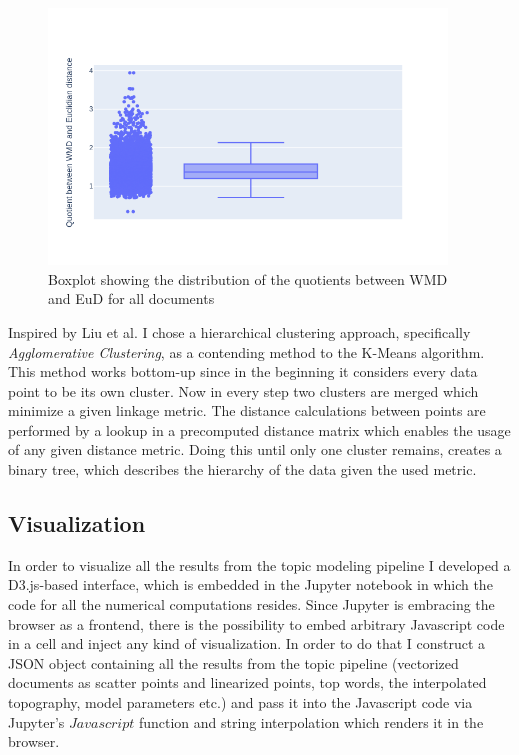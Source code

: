 \begin{figure}[htbp!]
	\centering
	\includegraphics[width=400px]{../chapters/implementation/pics/wmd-eud}
	\caption{\label{pic:wmd_eud_boxplot} Boxplot showing the distribution of the quotients between WMD and EuD for all documents}
\end{figure}

Inspired by Liu et al. \cite{Liu:2018:INE:3219819.3220001} I chose a hierarchical clustering approach, specifically \textit{Agglomerative Clustering}, as a contending method to the K-Means algorithm. This method works bottom-up since in the beginning it considers every data point to be its own cluster. Now in every step two clusters are merged which minimize a given linkage metric. The distance calculations between points are performed by a lookup in a precomputed distance matrix which enables the usage of any given distance metric. Doing this until only one cluster remains, creates a binary tree, which describes the hierarchy of the data given the used metric. 

\subsection{Visualization}

In order to visualize all the results from the topic modeling pipeline I developed a D3.js-based interface, which is embedded in the Jupyter notebook in which the code for all the numerical computations resides. Since Jupyter is embracing the browser as a frontend, there is the possibility to embed arbitrary Javascript code in a cell and inject any kind of visualization. In order to do that I construct a JSON object containing all the results from the topic pipeline (vectorized documents as scatter points and linearized points, top words, the interpolated topography, model parameters etc.) and pass it into the Javascript code via Jupyter's $Javascript$ function and string interpolation which renders it in the browser.

